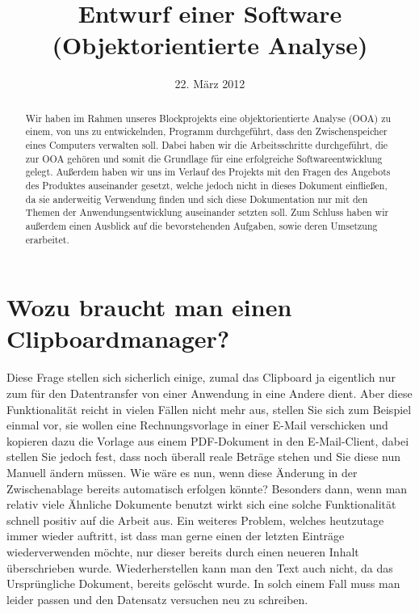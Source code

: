 \documentclass[a4paper,11pt,abstracton,titlepage]{scrartcl}
\title{Entwurf einer Software\\(Objektorientierte Analyse)}
\author{} %
\date{22. März 2012}
\begin{document}
\maketitle

\begin{abstract}
Wir haben im Rahmen unseres Blockprojekts eine objektorientierte Analyse (OOA)
zu einem, von uns zu entwickelnden, Programm durchgeführt, dass den
Zwischenspeicher eines Computers verwalten soll. Dabei haben wir die
Arbeitsschritte durchgeführt, die zur OOA gehören und somit die Grundlage für
eine erfolgreiche Softwareentwicklung gelegt. Außerdem haben wir uns im Verlauf
des Projekts mit den Fragen des Angebots des Produktes auseinander gesetzt,
welche jedoch nicht in dieses Dokument einfließen, da sie anderweitig Verwendung
finden und sich diese Dokumentation nur mit den Themen der Anwendungsentwicklung
auseinander setzten soll. Zum Schluss haben wir außerdem einen Ausblick auf die
bevorstehenden Aufgaben, sowie deren Umsetzung erarbeitet.
\end{abstract}

\tableofcontents
\thispagestyle{empty}
\newpage
\setcounter{page}{1}

\section{Wozu braucht man einen Clipboardmanager?}
Diese Frage stellen sich sicherlich einige, zumal das Clipboard ja eigentlich
nur zum für den Datentransfer von einer Anwendung in eine Andere dient. Aber
diese Funktionalität reicht in vielen Fällen nicht mehr aus, stellen Sie sich
zum Beispiel einmal vor, sie wollen eine Rechnungsvorlage in einer E-Mail
verschicken und kopieren dazu die Vorlage aus einem PDF-Dokument in den
E-Mail-Client, dabei stellen Sie jedoch fest, dass noch überall reale Beträge
stehen und Sie diese nun Manuell ändern müssen. Wie wäre es nun, wenn diese
Änderung in der Zwischenablage bereits automatisch erfolgen könnte? Besonders
dann, wenn man relativ viele Ähnliche Dokumente benutzt wirkt sich eine solche
Funktionalität schnell positiv auf die Arbeit aus. Ein weiteres Problem, welches
heutzutage immer wieder auftritt, ist dass man gerne einen der letzten Einträge
wiederverwenden möchte, nur dieser bereits durch einen neueren Inhalt
überschrieben wurde. Wiederherstellen kann man den Text auch nicht, da das
Ursprüngliche Dokument, bereits gelöscht wurde. In solch einem Fall muss man
leider passen und den Datensatz versuchen neu zu schreiben.
\end{document}
